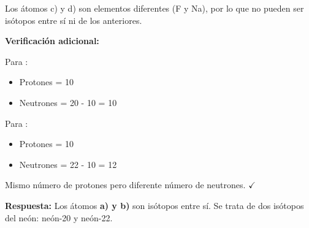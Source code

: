 \begin{exercise}
\begin{solu}
        Los átomos c) y d) son elementos diferentes (F y Na), por lo que no pueden ser isótopos entre sí ni de los anteriores.

        \textbf{Verificación adicional:}

        Para :
        \begin{itemize}
            \item Protones = 10
            \item Neutrones = 20 - 10 = 10
        \end{itemize}

        Para :
        \begin{itemize}
            \item Protones = 10
            \item Neutrones = 22 - 10 = 12
        \end{itemize}

        Mismo número de protones pero diferente número de neutrones. \( \checkmark \)

        \textbf{Respuesta:} Los átomos \textbf{a) y b)} son isótopos entre sí. Se trata de dos isótopos del neón: neón-20 y neón-22.
    \end{solu}
\end{exercise}

